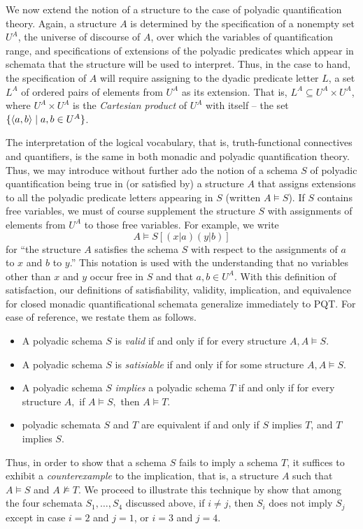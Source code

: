 We now extend the notion of a structure to the case of polyadic quantification theory. Again, a structure $A$ is determined by the specification of a nonempty set $U^A$, the universe of discourse of $A$, over which the variables of quantification range, and specifications of extensions of the polyadic predicates which appear in schemata that the structure will be used to interpret. Thus, in the case to hand, the specification of $A$ will require assigning to the dyadic predicate letter $L$, a set $L^A$ of ordered pairs of elements from $U^A$ as its extension. That is, $L^A\subseteq U^A\times U^A$, where $U^A\times U^A$ is the \emph{Cartesian product} of $U^A$ with itself -- the set $\{\mbox{$\langle a,b \rangle$}\mid a,b\in U^A\}$. 

The interpretation of the logical vocabulary, that is, truth-functional connectives and quantifiers, is the same in both monadic and polyadic quantification theory. Thus, we may introduce without further ado the notion of a schema $S$ of polyadic quantification being true in (or satisfied by) a structure $A$ that assigns extensions to all the polyadic predicate letters appearing in $S$ (written $A\models S$). If $S$ contains free variables, we must of course supplement the structure $S$ with assignments of elements from $U^A$ to those free variables. For example, we write
\[A\models S[(x|a)(y|b)]\]
for ``the structure $A$ satisfies the schema $S$ with respect to the assignments of $a$ to $x$ and $b$ to $y$.'' This notation is used with the understanding that no variables other than $x$ and $y$ occur free in $S$ and that $a,b\in U^A$. With this definition of satisfaction, our definitions of satisfiability, validity, implication, and equivalence for closed monadic quantificational schemata generalize immediately to PQT. For ease of reference, we restate them as follows.
\begin{itemize}
\item
A polyadic schema $S$ is \emph{ valid} if and only if for every structure $A, A
\models S.$
\item
A polyadic schema $S$ is \emph{ satisiable} if and only if for some structure $A,
A \models S.$
\item
A polyadic schema $S$ \emph{ implies} a polyadic schema $T$ if and only if for
every structure $A,$ if $A \models S,$ then $A \models T.$
\item
polyadic schemata $S$ and $T$ are equivalent if and only if $S$ implies $T$, and $T$ implies $S$. 
\end{itemize}
Thus, in order to show that a schema $S$ fails to imply a schema $T$, it suffices to exhibit a \emph{counterexample} to the implication, that is, a structure $A$ such that $A\models S$ and $A\not\models T$. We proceed to illustrate this technique by show that among the four schemata $S_1,\ldots,S_4$ discussed above, if $i\neq j$, then $S_i$ does not imply $S_j$ except in case $i=2$ and $j=1$, or $i=3$ and $j=4$.

